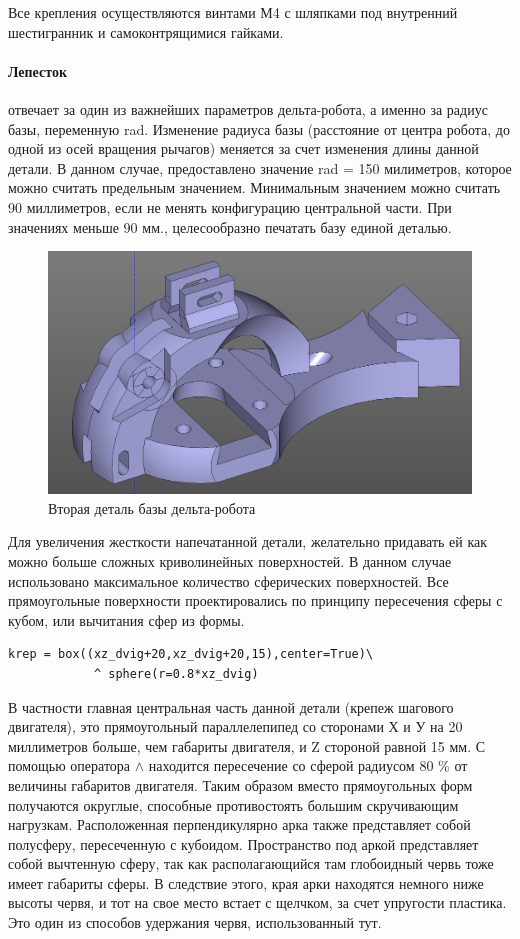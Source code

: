 Все крепления осуществляются винтами М4 с шляпками под внутренний шестигранник и самоконтрящимися гайками.

\paragraph{Лепесток} отвечает за один из важнейших параметров дельта-робота, а именно за радиус базы, переменную rad. Изменение радиуса базы (расстояние от центра робота, до одной из осей вращения рычагов) меняется за счет изменения длины данной детали. В данном случае, предоставлено значение rad = 150 милиметров, которое можно считать предельным значением. Минимальным значением можно считать 90 миллиметров, если не менять конфигурацию центральной части. При значениях меньше 90 мм., целесообразно печатать базу единой деталью.   

\begin{figure}[h!]
\centering
\includegraphics[width=0.8\linewidth]{./image/lepestok}
\caption{Вторая деталь базы дельта-робота}
\end{figure} 

Для увеличения жесткости напечатанной детали, желательно придавать ей как можно больше сложных криволинейных поверхностей. В данном случае использовано максимальное количество сферических поверхностей. Все прямоугольные поверхности проектировались по принципу пересечения сферы с кубом, или вычитания сфер из формы. 

\begin{lstlisting}[style=python,caption=Булева операция пересечения]
     krep = box((xz_dvig+20,xz_dvig+20,15),center=True)\
            ^ sphere(r=0.8*xz_dvig)
\end{lstlisting}

В частности главная центральная часть данной детали (крепеж шагового двигателя), это прямоугольный параллелепипед со сторонами Х и У на 20 миллиметров больше, чем габариты двигателя, и  Z стороной равной 15 мм. С помощью оператора $\wedge$ находится пересечение со сферой радиусом 80 $\%$ от величины габаритов двигателя. Таким образом вместо прямоугольных форм получаются округлые,  способные противостоять большим скручивающим нагрузкам. Расположенная перпендикулярно арка также представляет собой полусферу, пересеченную с кубоидом. Пространство под аркой представляет собой вычтенную сферу, так как располагающийся там глобоидный червь тоже имеет габариты сферы. В следствие этого, края арки находятся немного ниже высоты червя, и тот на свое место встает с щелчком, за счет упругости пластика. Это один из способов удержания червя, использованный тут.

